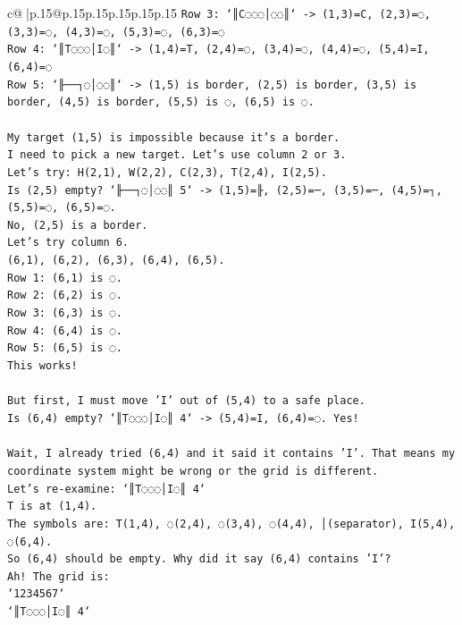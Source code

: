 \documentclass{article}
\begin{document}
{\begin{supertabular}{c@{$\;$}|p{.15\linewidth}@{}p{.15\linewidth}p{.15\linewidth}p{.15\linewidth}p{.15\linewidth}p{.15\linewidth}}
{{{\texttt{Row 3: `║C◌◌◌│◌◌║` {-}> (1,3)=C, (2,3)=◌, (3,3)=◌, (4,3)=◌, (5,3)=◌, (6,3)=◌} \\
\texttt{Row 4: `║T◌◌◌│I◌║` {-}> (1,4)=T, (2,4)=◌, (3,4)=◌, (4,4)=◌, (5,4)=I, (6,4)=◌} \\
\texttt{Row 5: `╟──┐◌│◌◌║` {-}> (1,5) is border, (2,5) is border, (3,5) is border, (4,5) is border, (5,5) is ◌, (6,5) is ◌.} \\
\\ 
\texttt{My target (1,5) is impossible because it's a border.} \\
\texttt{I need to pick a new target. Let's use column 2 or 3.} \\
\texttt{Let's try: H(2,1), W(2,2), C(2,3), T(2,4), I(2,5).} \\
\texttt{Is (2,5) empty? `╟──┐◌│◌◌║ 5` {-}> (1,5)=╟, (2,5)=─, (3,5)=─, (4,5)=┐, (5,5)=◌, (6,5)=◌.} \\
\texttt{No, (2,5) is a border.} \\
\texttt{Let's try column 6.} \\
\texttt{(6,1), (6,2), (6,3), (6,4), (6,5).} \\
\texttt{Row 1: (6,1) is ◌.} \\
\texttt{Row 2: (6,2) is ◌.} \\
\texttt{Row 3: (6,3) is ◌.} \\
\texttt{Row 4: (6,4) is ◌.} \\
\texttt{Row 5: (6,5) is ◌.} \\
\texttt{This works!} \\
\\ 
\texttt{But first, I must move 'I' out of (5,4) to a safe place.} \\
\texttt{Is (6,4) empty? `║T◌◌◌│I◌║ 4` {-}> (5,4)=I, (6,4)=◌. Yes!} \\
\\ 
\texttt{Wait, I already tried (6,4) and it said it contains 'I'. That means my coordinate system might be wrong or the grid is different.} \\
\texttt{Let's re{-}examine: `║T◌◌◌│I◌║ 4`} \\
\texttt{T is at (1,4).} \\
\texttt{The symbols are: T(1,4), ◌(2,4), ◌(3,4), ◌(4,4), │(separator), I(5,4), ◌(6,4).} \\
\texttt{So (6,4) should be empty. Why did it say (6,4) contains 'I'?} \\
\texttt{Ah! The grid is:} \\
\texttt{`1234567`} \\
\texttt{`║T◌◌◌│I◌║ 4`} \\
}}}
\end{supertabular}}
\end{document}

